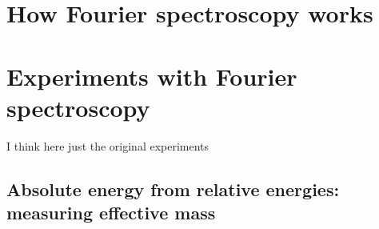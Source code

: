 
%



\section{How Fourier spectroscopy works}
\section{Experiments with Fourier spectroscopy}
I think here just the original experiments

\subsection{Absolute energy from relative energies: measuring effective mass}



